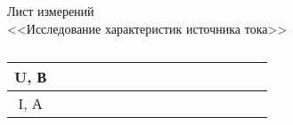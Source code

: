 \documentclass[a4paper,12pt]{article}
\begin{document}
	\newpage
	\pagestyle{fancy}
	
	\begin{center}
		{\Large Лист измерений}\\
		<<Исследование характеристик источника тока>>
	\end{center}

\begin{table}[h]
	\caption{}
	\begin{tabularx}{\textwidth}{|c|X|X|X|X|X|X|X|X|X|X|X|X|X|X|X|}
		\hline
U, В & & & & & & & & & & & & & & & \\ \hline
I, А & & & & & & & & & & & & & & & \\ \hline
	\end{tabularx}
\end{table}
\end{document}
